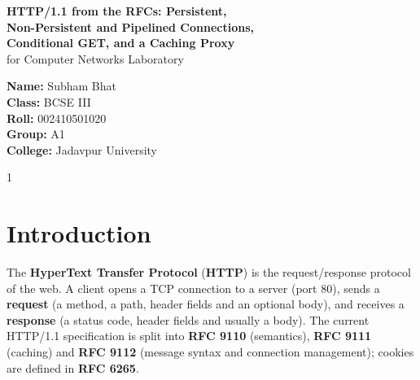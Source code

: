 \documentclass[11pt,a4paper]{article}
\begin{document}
\begin{titlepage}
    \centering
    \vspace*{4.2cm}

    {\LARGE \textbf{HTTP/1.1 from the RFCs: Persistent,}}\\[0.7em]
    {\LARGE \textbf{Non-Persistent and Pipelined Connections,}}\\[0.7em]
    {\LARGE \textbf{Conditional GET, and a Caching Proxy}}\\[1.4em]

    {\large for Computer Networks Laboratory}

    \vspace{3.8cm}

    {\large
    \textbf{Name:} Subham Bhat\\[0.55em]
    \textbf{Class:} BCSE III\\[0.55em]
    \textbf{Roll:} 002410501020\\[0.55em]
    \textbf{Group:} A1\\[0.55em]
    \textbf{College:} Jadavpur University
    }

    \vfill
    {\normalsize 1}
\end{titlepage}

\setcounter{page}{2}
\tableofcontents
\newpage

\setcounter{page}{3}

\section{Introduction}
\noindent The \textbf{HyperText Transfer Protocol} (\textbf{HTTP}) is the request/response protocol of the web. A client opens a TCP connection to a server (port 80), sends a \textbf{request} (a method, a path, header fields and an optional body), and receives a \textbf{response} (a status code, header fields and usually a body). The current HTTP/1.1 specification is split into \textbf{RFC 9110} (semantics), \textbf{RFC 9111} (caching) and \textbf{RFC 9112} (message syntax and connection management); cookies are defined in \textbf{RFC 6265}.
\end{document}
